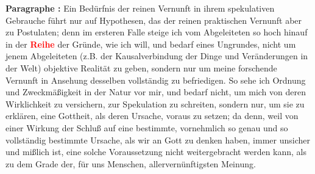 \documentclass[a4paper,12pt,twoside]{book}
\newcommand{\match}[1]{\textcolor{red}{\textbf{#1}}}
\begin{document}
	\noindent\textbf{Paragraphe : }Ein Bedürfnis der reinen Vernunft in ihrem spekulativen Gebrauche führt nur auf Hypothesen, das der reinen praktischen Vernunft aber zu Postulaten; denn im ersteren Falle steige ich vom Abgeleiteten so hoch hinauf in der \match{Reihe} der Gründe, wie ich will, und bedarf eines Ungrundes, nicht um jenem Abgeleiteten (z.B. der Kausalverbindung der Dinge und Veränderungen in der Welt) objektive Realität zu geben, sondern nur um meine forschende Vernunft in Ansehung desselben vollständig zu befriedigen. So sehe ich Ordnung und Zweckmäßigkeit in der Natur vor mir, und bedarf nicht, um mich von deren Wirklichkeit zu versichern, zur Spekulation zu schreiten, sondern nur, um sie zu erklären, eine Gottheit, als deren Ursache, voraus zu setzen; da denn, weil von einer Wirkung der Schluß auf eine bestimmte, vornehmlich so genau und so vollständig bestimmte Ursache, als wir an Gott zu denken haben, immer unsicher und mißlich ist, eine solche Voraussetzung nicht weitergebracht werden kann, als zu dem Grade der, für uns Menschen, allervernünftigsten Meinung.
	
\end{document}
